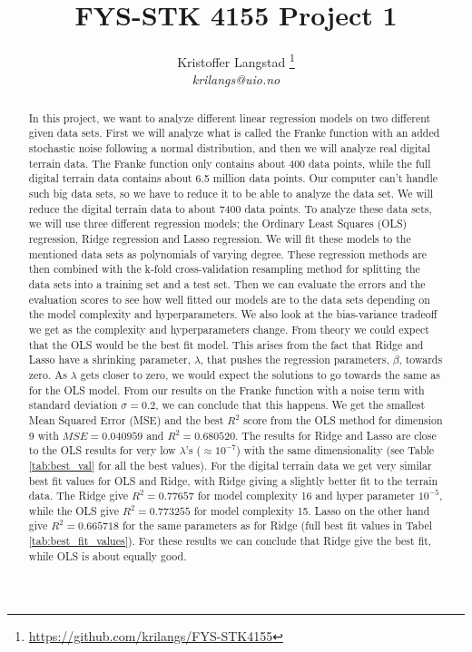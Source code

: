 \documentclass[12pt,a4paper,english]{article}
\title{FYS-STK 4155 Project 1}
\date{}
\author{ Kristoffer Langstad \footnote{\url{https://github.com/krilangs/FYS-STK4155}}\\ \textit{krilangs@uio.no}}
\begin{document}
\maketitle
\begin{abstract}
In this project, we want to analyze different linear regression models on two different given data sets.  First we will analyze what is called the Franke function with an added stochastic noise following a normal distribution, and then we will analyze real digital terrain data. The Franke function only contains about 400 data points, while the full digital terrain data contains about 6.5 million data points. Our computer can't handle such big data sets, so we have to reduce it to be able to analyze the data set. We will reduce the digital terrain data to about 7400 data points. To analyze these data sets, we will use three different regression models; the Ordinary Least Squares (OLS) regression, Ridge regression and Lasso regression. We will fit these models to the mentioned data sets as polynomials of varying degree. These regression methods are then combined with the k-fold cross-validation resampling method for splitting the data sets into a training set and a test set. Then we can evaluate the errors and the evaluation scores to see how well fitted our models are to the data sets depending on the model complexity and hyperparameters. We also look at the bias-variance tradeoff we get as the complexity and hyperparameters change. From theory we could expect that the OLS would be the best fit model. This arises from the fact that Ridge and Lasso have a shrinking parameter, $\lambda$, that pushes the regression parameters, $\beta$, towards zero. As $\lambda$ gets closer to zero, we would expect the solutions to go towards the same as for the OLS model. From our results on the Franke function with a noise term with standard deviation $\sigma=0.2$, we can conclude that this happens. We get the smallest Mean Squared Error (MSE) and the best $R^2$ score from the OLS method for dimension 9 with $MSE=0.040959$ and $R^2=0.680520$. The results for Ridge and Lasso are close to the OLS results for very low $\lambda$'s ($\approx 10^{-7}$) with the same dimensionality (see Table \ref{tab:best_val} for all the best values). For the digital terrain data we get very similar best fit values for OLS and Ridge, with Ridge giving a slightly better fit to the terrain data. The Ridge give $R^2=0.77657$ for model complexity 16 and hyper parameter $10^{-5}$, while the OLS give $R^2=0.773255$ for model complexity 15. Lasso on the other hand give $R^2=0.665718$ for the same parameters as for Ridge (full best fit values in Tabel \ref{tab:best_fit_values}). For these results we can conclude that Ridge give the best fit, while OLS is about equally good.
\end{abstract}
\end{document}
